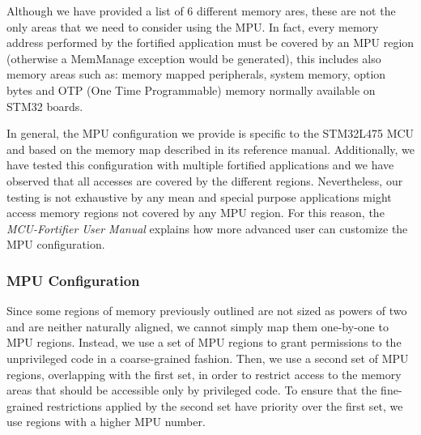 \documentclass{article}
\begin{document}
Although we have provided a list of 6 different memory ares, these are not the only areas that we need to consider using the MPU. In fact, every memory address performed by the fortified application must be covered by an MPU region (otherwise a MemManage exception would be generated), this includes also memory areas such as: memory mapped peripherals, system memory, option bytes and OTP (One Time Programmable) memory normally available on STM32 boards.

In general, the MPU configuration we provide is specific to the STM32L475 MCU and based on the memory map described in its reference manual\cite{rm0351}.
Additionally, we have tested this configuration with multiple fortified applications and we have observed that all accesses are covered by the different regions. Nevertheless, our testing is not exhaustive by any mean and special purpose applications might access memory regions not covered by any MPU region. For this reason, the \textit{MCU-Fortifier User Manual} explains how more advanced user can customize the MPU configuration.

\subsubsection{MPU Configuration}
Since some regions of memory previously outlined are not sized as powers of two and are neither naturally aligned, we cannot simply map them one-by-one to MPU regions. Instead, we use a set of MPU regions to grant permissions to the unprivileged code in a coarse-grained fashion. Then, we use a second set of MPU regions, overlapping with the first set, in order to restrict access to the memory areas that should be accessible only by privileged code. To ensure that the fine-grained restrictions applied by the second set have priority over the first set, we use regions with a higher MPU number.
\end{document}

